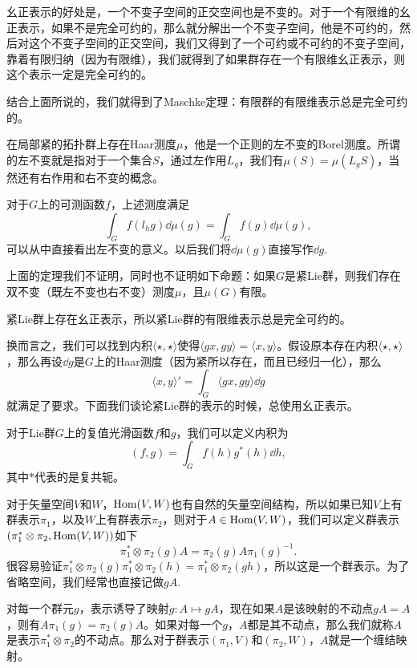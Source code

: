 幺正表示的好处是，一个不变子空间的正交空间也是不变的。对于一个有限维的幺正表示，如果不是完全可约的，那么就分解出一个不变子空间，他是不可约的，然后对这个不变子空间的正交空间，我们又得到了一个可约或不可约的不变子空间，靠着有限归纳（因为有限维），我们就得到了如果群存在一个有限维幺正表示，则这个表示一定是完全可约的。

\begin{thm}
结合上面所说的，我们就得到了Maschke定理：有限群的有限维表示总是完全可约的。 
\end{thm}

\begin{thm}
在局部紧的拓扑群上存在Haar测度$\mu$，他是一个正则的左不变的Borel测度。所谓的左不变就是指对于一个集合$S$，通过左作用$L_g$，我们有$\mu(S)=\mu(L_gS)$，当然还有右作用和右不变的概念。
\end{thm}

对于$G$上的可测函数$f$，上述测度满足
\[
	\int_G f(l_h g)\dd \mu(g)=\int_G f(g)\dd \mu(g),
\]
可以从中直接看出左不变的意义。以后我们将$\dd \mu(g)$直接写作$\dd g$.

\para 上面的定理我们不证明，同时也不证明如下命题：如果$G$是紧Lie群，则我们存在双不变（既左不变也右不变）测度$\mu$，且$\mu(G)$有限。

\begin{pro}
紧Lie群上存在幺正表示，所以紧Lie群的有限维表示总是完全可约的。 
\end{pro}

换而言之，我们可以找到内积$\langle \star,\star\rangle$使得$\langle gx,gy\rangle=\langle x,y\rangle$。假设原本存在内积$\langle \star,\star \rangle$，那么再设$\dd g$是$G$上的Haar测度（因为紧所以存在，而且已经归一化），那么
\[
	\langle x,y\rangle'=\int_G \langle gx,gy \rangle \dd g
\]
就满足了要求。下面我们谈论紧Lie群的表示的时候，总使用幺正表示。

\para 对于Lie群$G$上的复值光滑函数$f$和$g$，我们可以定义内积为
\[
	(f,g)=\int_G f(h)g^*(h)\dd h,
\]
其中$*$代表的是复共轭。

\para 对于矢量空间$V$和$W$，$\operatorname{Hom}(V,W)$也有自然的矢量空间结构，所以如果已知$V$上有群表示$\pi_1$，以及$W$上有群表示$\pi_2$，则对于$A\in \operatorname{Hom}(V,W)$，我们可以定义群表示$(\pi_1^*\otimes\pi_2,\operatorname{Hom}(V,W))$如下
\[
	\pi_1^*\otimes\pi_2(g)A=\pi_2(g)A\pi_1(g)^{-1}.
\]
很容易验证$\pi_1^*\otimes\pi_2(g)\pi_1^*\otimes\pi_2(h)=\pi_1^*\otimes\pi_2(gh)$，所以这是一个群表示。为了省略空间，我们经常也直接记做$gA$.

对每一个群元$g$，表示诱导了映射$g:A\mapsto gA$，现在如果$A$是该映射的不动点$gA=A$，则有$A\pi_1(g)=\pi_2(g)A$。如果对每一个$g$，$A$都是其不动点，那么我们就称$A$是表示$\pi_1^*\otimes\pi_2$的不动点。那么对于群表示$(\pi_1,V)$和$(\pi_2,W)$，$A$就是一个缠结映射。

